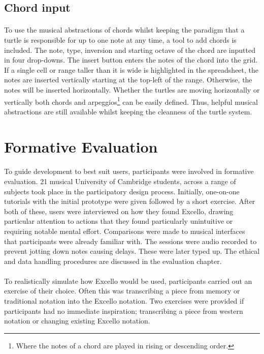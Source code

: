 \subsection{Chord input}

\paragraph{} To use the musical abstractions of chords whilst keeping the paradigm that a turtle is responsible for up to one note at any time, a tool to add chords is included. The note, type, inversion and starting octave of the chord are inputted in four drop-downs. The insert button enters the notes of the chord into the grid. If a single cell or range taller than it is wide is highlighted in the spreadsheet, the notes are inserted vertically starting at the top-left of the range. Otherwise, the notes will be inserted horizontally. Whether the turtles are moving horizontally or vertically both chords and arpeggios\footnote{Where the notes of a chord are played in rising or descending order.} can be easily defined. Thus, helpful musical abstractions are still available whilst keeping the cleanness of the turtle system.

\section{Formative Evaluation}

\paragraph{} To guide development to best suit users, participants were involved in formative evaluation. 21 musical University of Cambridge students, across a range of subjects took place in the participatory design process. Initially, one-on-one tutorials with the initial prototype were given followed by a short exercise. After both of these, users were interviewed on how they found Excello, drawing particular attention to actions that they found particularly unintuitive or requiring notable mental effort. Comparisons were made to musical interfaces that participants were already familiar with. The sessions were audio recorded to prevent jotting down notes causing delays. These were later typed up. The ethical and data handling procedures are discussed in the evaluation chapter.

\paragraph{} To realistically simulate how Excello would be used, participants carried out an exercise of their choice. Often this was transcribing a piece from memory or traditional notation into the Excello notation. Two exercises were provided if participants had no immediate inspiration; transcribing a piece from western notation or changing existing Excello notation.

